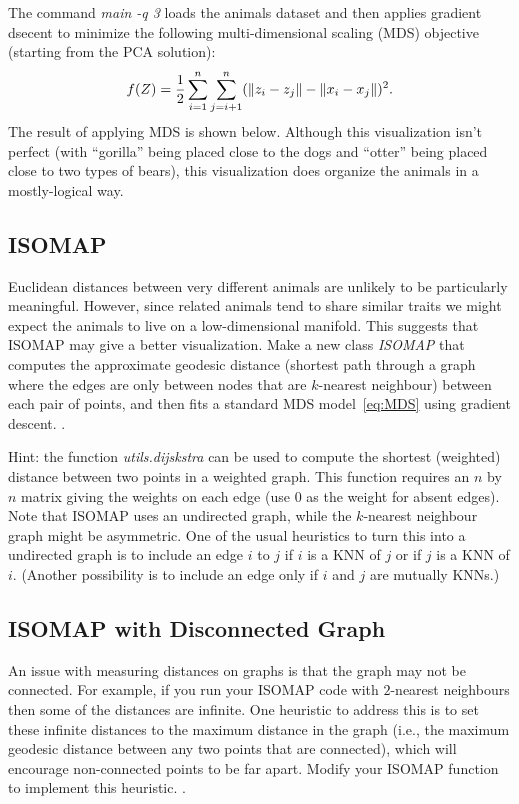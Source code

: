 \documentclass{article}
\begin{document}
The command \emph{main -q 3} loads the animals dataset and then applies gradient dsecent to minimize the following multi-dimensional scaling (MDS) objective (starting from the PCA solution):
\begin{equation}
\label{eq:MDS}
f(Z) =  \frac{1}{2}\sum_{i=1}^n\sum_{j=i+1}^n (  \|z_i - z_j\| - \|x_i - x_j\|)^2.
\end{equation}
 The result of applying MDS is shown below.
Although this visualization isn't perfect (with ``gorilla'' being placed close to the dogs and ``otter'' being placed close to two types of bears), this visualization does organize the animals in a mostly-logical way.


\subsection{ISOMAP}

Euclidean distances between very different animals are unlikely to be particularly meaningful. However, since related animals tend to share similar traits we might expect the animals to live on a low-dimensional manifold. This suggests that ISOMAP may give a better visualization. 
Make a new class \emph{ISOMAP} that computes the approximate geodesic distance (shortest path through a graph where the edges are only between nodes that are $k$-nearest neighbour) between each pair of points, and then fits a standard MDS model~\eqref{eq:MDS} using gradient descent. .

Hint: the function \emph{utils.dijskstra} can be used to compute the shortest (weighted) distance between two points in a weighted graph. This function requires an $n$ by $n$ matrix giving the weights on each edge (use $0$ as the weight for absent edges). Note that ISOMAP uses an undirected graph, while the $k$-nearest neighbour graph might be asymmetric. One of the usual heuristics to turn this into a undirected graph is to include an edge $i$ to $j$ if $i$ is a KNN of $j$ or if $j$ is a KNN of $i$. (Another possibility is to include an edge only if $i$ and $j$ are mutually KNNs.)


\subsection{ISOMAP with Disconnected Graph}

An issue with measuring distances on graphs is that the graph may not be connected. For example, if you run your ISOMAP code with $2$-nearest neighbours then some of the distances are infinite. One heuristic to address this is to set these infinite distances to the maximum distance in the graph (i.e., the maximum geodesic distance between any two points that are connected), which will encourage non-connected points to be far apart. Modify your ISOMAP function to implement this heuristic. .
\end{document}
